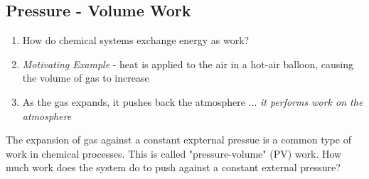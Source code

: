 \documentclass[../CHEM152Notes.tex]{subfiles}
\begin{document}
\subsection*{Pressure - Volume Work}
\begin{enumerate}
    \item How do chemical systems exchange energy as work?
    \item \emph{Motivating Example} - heat is applied to the air in a hot-air balloon, causing the volume of gas to increase
    \item As the gas expands, it pushes back the atmosphere ... \emph{it performs work on the atmosphere}
\end{enumerate}
The expansion of gas against a constant expternal pressue is a common type of work in chemical processes. This is called "pressure-volume" (PV) work. 
\newline
How much work does the system do to push against a constant external pressure? 
\newline
\end{document}
